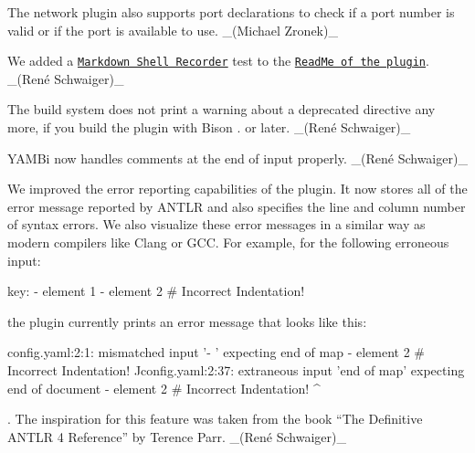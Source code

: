 \begin{DoxyItemize}
\item The {\ttfamily network} plugin also supports port declarations to check if a port number is valid or if the port is available to use. \+\_\+(\+Michael Zronek)\+\_\+
\item We added a \href{https://master.libelektra.org/tests/shell/shell_recorder/tutorial_wrapper}{\tt Markdown Shell Recorder} test to the \href{https://www.libelektra.org/plugins/network}{\tt Read\+Me of the plugin}. \+\_\+(René Schwaiger)\+\_\+
\end{DoxyItemize}


\begin{DoxyItemize}
\item The build system does not print a warning about a deprecated directive any more, if you build the plugin with Bison {.} or later. \+\_\+(René Schwaiger)\+\_\+
\item Y\+A\+M\+Bi now handles comments at the end of input properly. \+\_\+(René Schwaiger)\+\_\+
\end{DoxyItemize}


\begin{DoxyItemize}
\item We improved the error reporting capabilities of the plugin. It now stores all of the error message reported by A\+N\+T\+LR and also specifies the line and column number of syntax errors. We also visualize these error messages in a similar way as modern compilers like Clang or G\+CC. For example, for the following erroneous input\+:
\end{DoxyItemize}


\begin{DoxyCode}
key: - element 1
- element 2 # Incorrect Indentation!
\end{DoxyCode}


the plugin currently prints an error message that looks like this\+:


\begin{DoxyCode}
config.yaml:2:1: mismatched input '- ' expecting end of map
                 - element 2 # Incorrect Indentation!
                 ^^
config.yaml:2:37: extraneous input 'end of map' expecting end of document
                  - element 2 # Incorrect Indentation!
                                                      ^
\end{DoxyCode}


. The inspiration for this feature was taken from the book “\+The Definitive A\+N\+T\+LR 4 Reference” by Terence Parr. \+\_\+(René Schwaiger)\+\_\+


